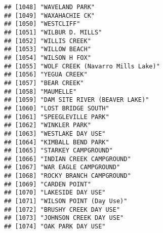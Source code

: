 \documentclass[
]{article}
\begin{document}
\begin{verbatim}
## [1048] "WAVELAND PARK"                                                                       
## [1049] "WAXAHACHIE CK"                                                                       
## [1050] "WESTCLIFF"                                                                           
## [1051] "WILBUR D. MILLS"                                                                     
## [1052] "WILLIS CREEK"                                                                        
## [1053] "WILLOW BEACH"                                                                        
## [1054] "WILSON H FOX"                                                                        
## [1055] "WOLF CREEK (Navarro Mills Lake)"                                                     
## [1056] "YEGUA CREEK"                                                                         
## [1057] "BEAR CREEK"                                                                          
## [1058] "MAUMELLE"                                                                            
## [1059] "DAM SITE RIVER (BEAVER LAKE)"                                                        
## [1060] "LOST BRIDGE SOUTH"                                                                   
## [1061] "SPEEGLEVILLE PARK"                                                                   
## [1062] "WINKLER PARK"                                                                        
## [1063] "WESTLAKE DAY USE"                                                                    
## [1064] "KIMBALL BEND PARK"                                                                   
## [1065] "STARKEY CAMPGROUND"                                                                  
## [1066] "INDIAN CREEK CAMPGROUND"                                                             
## [1067] "WAR EAGLE CAMPGROUND"                                                                
## [1068] "ROCKY BRANCH CAMPGROUND"                                                             
## [1069] "CARDEN POINT"                                                                        
## [1070] "LAKESIDE DAY USE"                                                                    
## [1071] "WILSON POINT (Day Use)"                                                              
## [1072] "BRUSHY CREEK DAY USE"                                                                
## [1073] "JOHNSON CREEK DAY USE"                                                               
## [1074] "OAK PARK DAY USE"                                                                    

\end{verbatim}
\end{document}
